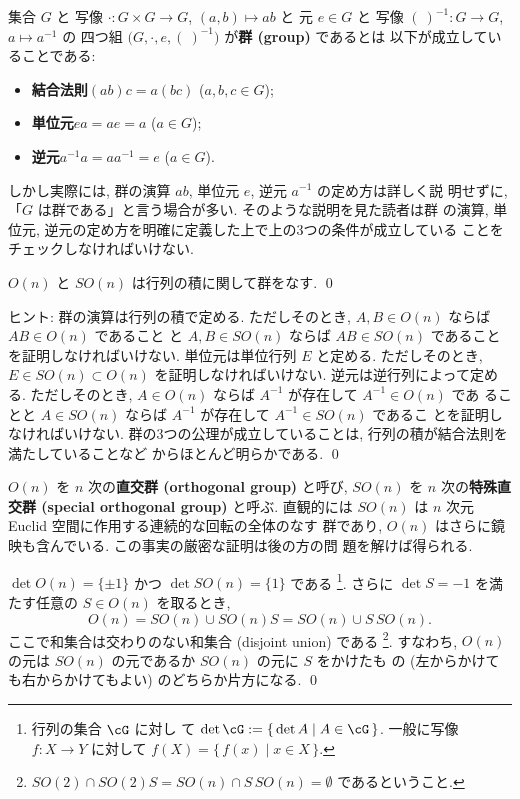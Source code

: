 \documentclass[12pt,twoside]{jarticle}
\begin{document}
集合 $G$ と
写像 $\cdot:G\times G\to G$, $(a,b)\mapsto ab$ と
元 $e\in G$ と
写像 $(\ )^{-1}:G\to G$, $a\mapsto a^{-1}$ の
四つ組 $\bigr(G,\cdot,e,(\ )^{-1}\bigl)$ が{\bf 群 (group)} であるとは
以下が成立していることである:
\begin{itemize}
\item {\bf 結合法則}\quad $(ab)c=a(bc)$ \quad ($a,b,c\in G$);
\item {\bf 単位元}\quad $ea=ae=a$ \quad ($a\in G$);
\item {\bf 逆元}\quad $a^{-1}a=aa^{-1}=e$ \quad ($a\in G$).
\end{itemize}
しかし実際には, 群の演算 $ab$, 単位元 $e$, 逆元 $a^{-1}$ の定め方は詳しく説
明せずに, 「$G$ は群である」と言う場合が多い.  そのような説明を見た読者は群
の演算, 単位元, 逆元の定め方を明確に定義した上で上の3つの条件が成立している
ことをチェックしなければいけない.

\begin{question}
  $O(n)$ と $SO(n)$ は行列の積に関して群をなす. \qed
\end{question}

\noindent
ヒント: 群の演算は行列の積で定める. 
ただしそのとき, $A,B\in O(n)$ ならば $AB\in O(n)$ であること
と $A,B\in SO(n)$ ならば $AB\in SO(n)$ であることを証明しなければいけない.
単位元は単位行列 $E$ と定める.
ただしそのとき, $E\in SO(n)\subset O(n)$ を証明しなければいけない.
逆元は逆行列によって定める.
ただしそのとき, $A\in O(n)$ ならば $A^{-1}$ が存在して $A^{-1}\in O(n)$ であ
ることと $A\in SO(n)$ ならば $A^{-1}$ が存在して $A^{-1}\in SO(n)$ であるこ
とを証明しなければいけない.
群の3つの公理が成立していることは, 行列の積が結合法則を満たしていることなど
からほとんど明らかである.
\qed

\medskip

$O(n)$ を $n$ 次の{\bf 直交群 (orthogonal group)} と呼び,
$SO(n)$ を $n$ 次の{\bf 特殊直交群 (special orthogonal group)} と呼ぶ.
直観的には $SO(n)$ は $n$ 次元 Euclid 空間に作用する連続的な回転の全体のなす
群であり, $O(n)$ はさらに鏡映も含んでいる.  この事実の厳密な証明は後の方の問
題を解けば得られる.


\begin{question}
\label{q:O(n)=SO(n)cupSO(n)S}
  $\det O(n) = \{\pm 1\}$ かつ $\det SO(n) = \{1\}$ である%
  \footnote{行列の集合 $\cG$ に対し
    て $\det\cG:=\{\,\det A\mid A\in\cG\,\}$.
    一般に写像 $f:X\to Y$ に対して $f(X)=\{\,f(x)\mid x\in X\,\}$.}.
  さらに $\det S = -1$ を満たす任意の $S\in O(n)$ を取るとき,
  \begin{equation*}
    O(n) = SO(n) \cup SO(n)S = SO(n) \cup S\,SO(n).
  \end{equation*}
  ここで和集合は交わりのない和集合 (disjoint union) である%
  \footnote{$SO(2)\cap SO(2)S = SO(n) \cap S\,SO(n) = \emptyset$ 
    であるということ.}.
  すなわち, $O(n)$ の元は $SO(n)$ の元であるか $SO(n)$ の元に $S$ をかけたも
  の (左からかけても右からかけてもよい) のどちらか片方になる. 
  \qed
\end{question}
\end{document}
